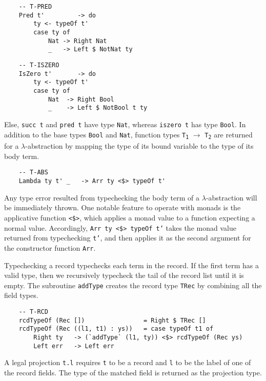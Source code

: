 \documentclass[fleqn, 11pt]{article}
\begin{document}
\begin{Verbatim}
    -- T-PRED
    Pred t'         -> do                                     
        ty <- typeOf t' 
        case ty of  
            Nat -> Right Nat
            _   -> Left $ NotNat ty          
\end{Verbatim}

\begin{Verbatim}
    -- T-ISZERO
    IsZero t'       -> do                                      
        ty <- typeOf t' 
        case ty of 
            Nat  -> Right Bool
            _    -> Left $ NotBool t ty            
\end{Verbatim}

Else, \texttt{succ t} and \texttt{pred t} have type \texttt{Nat}, whereas \texttt{iszero t} has type \texttt{Bool}. In addition to the 
base types \texttt{Bool} and \texttt{Nat}, function types \texttt{T\textsubscript{1}} $\rightarrow$ \texttt{T\textsubscript{2}} are 
returned for a $\lambda$-abstraction by mapping the type of its bound variable to the type of its body term.  

\begin{Verbatim}
    -- T-ABS
    Lambda ty t' _   -> Arr ty <$> typeOf t'    
\end{Verbatim}

Any type error resulted from typechecking the body term of a $\lambda$-abstraction will be immediately thrown. One notable feature to 
operate with monads is the applicative function \texttt{<\$>}, which applies a monad value to a function expecting a normal value. 
Accordingly, \texttt{Arr ty <\$> typeOf t'} takes the monad value returned from typechecking \texttt{t'}, and then applies it as the 
second argument for the constructor function \texttt{Arr}.

Typechecking a record typechecks each term in the record. If the first term has a valid type, then we recursively typecheck the tail 
of the record list until it is empty. The subroutine \texttt{addType} creates the record type \texttt{TRec} by combining all the 
field types.  

\begin{Verbatim}
    -- T-RCD
    rcdTypeOf (Rec [])                = Right $ TRec []
    rcdTypeOf (Rec ((l1, t1) : ys))   = case typeOf t1 of 
        Right ty   -> (`addType` (l1, ty)) <$> rcdTypeOf (Rec ys) 
        Left err   -> Left err
\end{Verbatim}

A legal projection \texttt{t.l} requires \texttt{t} to be a record and \texttt{l} to be the label of one of the record fields. The type 
of the matched field is returned as the projection type.
\end{document}
